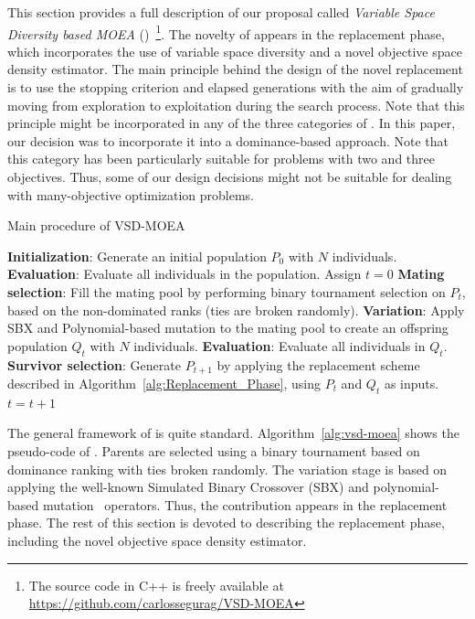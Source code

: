 
This section provides a full description of our proposal called \textit{Variable Space Diversity based MOEA} 
(\VSDMOEA{})~\footnote{The source code in C++ is freely available at \url{https://github.com/carlossegurag/VSD-MOEA}}.
%
The novelty of \VSDMOEA{} appears in the replacement phase, which incorporates
the use of variable space diversity and a novel objective space density estimator. 
%
The main principle behind the design of the novel replacement is to use the stopping criterion and 
elapsed generations with the aim of gradually moving from exploration to exploitation during the search process.
%
Note that this principle might be incorporated in any of the three categories of \MOEAS{}.
%
In this paper, our decision was to incorporate it into a dominance-based approach.
%
Note that this category has been particularly suitable for problems with two and three objectives.
%
Thus, some of our design decisions might not be suitable for dealing with many-objective optimization problems.
\begin{algorithm}[t]
	\caption{Main procedure of VSD-MOEA} 
	\begin{small}
\begin{algorithmic}[1]
 	\STATE \textbf{Initialization}: Generate an initial population $P_0$ with $N$ individuals.
	\STATE \textbf{Evaluation}: Evaluate all individuals in the population.
	\STATE Assign $t=0$
	   \STATE \textbf{Mating selection}: Fill the mating pool by performing binary tournament selection on $P_t$, 
		 based on the non-dominated ranks (ties are broken randomly).
	   \STATE \textbf{Variation}: Apply SBX and Polynomial-based mutation to the mating pool to create an offspring population $Q_t$
		 with $N$ individuals.
		 \STATE \textbf{Evaluation}: Evaluate all individuals in $Q_t$.
	   \STATE \textbf{Survivor selection}: Generate $P_{t+1}$ by applying the replacement scheme 
		 described in Algorithm~\ref{alg:Replacement_Phase}, using $P_t$ and $Q_t$ as inputs.
	   \STATE $t=t+1$
	\ENDWHILE
	\end{algorithmic}
	\end{small}
\label{alg:vsd-moea}
\end{algorithm}

The general framework of \VSDMOEA{} is quite standard.
%
Algorithm~\ref{alg:vsd-moea} shows the pseudo-code of \VSDMOEA{}.
%
Parents are selected using a binary tournament based on dominance ranking with ties broken randomly.
%
The variation stage is based on applying the well-known Simulated Binary Crossover (SBX) 
and polynomial-based mutation~\citep{Joel:SBX1994, Joel:Mutation} operators.
%
Thus, the contribution appears in the replacement phase.
%
The rest of this section is devoted to describing the replacement phase, including the novel objective space density 
estimator.

